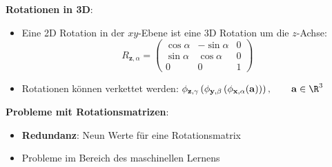 \medskip
\textbf{Rotationen in 3D}:
\begin{itemize}
	\item Eine 2D Rotation in der $xy$-Ebene ist eine 3D Rotation um die $z$-Achse: $$R_{\mathbf{z},\alpha}=\left(\begin{matrix}
		\cos\alpha & -\sin\alpha & 0 \\
		\sin\alpha & \cos\alpha & 0 \\
		0 & 0 & 1
	\end{matrix}\right)$$
	\item Rotationen können verkettet werden: $\phi_{\mathbf{z},\gamma}\left(\phi_{\mathbf{y},\beta}\left(\phi_{\mathbf{x},\alpha}(\mathbf{a})\right)\right),\qquad \mathbf{a}\in\R^3$
\end{itemize}
\medskip
\textbf{Probleme mit Rotationsmatrizen}:
\begin{itemize}
	\item \textbf{Redundanz}: Neun Werte für eine Rotationsmatrix
	\item Probleme im Bereich des maschinellen Lernens
\end{itemize}
\pagebreak

